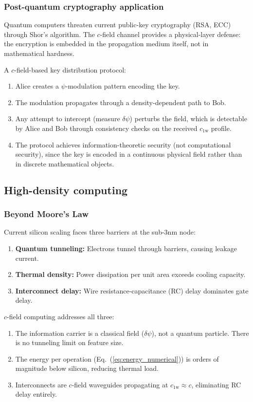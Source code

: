 \documentclass[aps,prd,twocolumn,superscriptaddress,nofootinbib,floatfix]{revtex4-2}
\newcommand{\psifield}{\psi}
\newcommand{\cfield}{c_{\text{1w}}}
\newcommand{\cvac}{c}
\begin{document}
\subsubsection{Post-quantum cryptography application}

Quantum computers threaten current public-key cryptography
(RSA, ECC) through Shor's algorithm. The $c$-field channel
provides a physical-layer defense: the encryption is embedded
in the propagation medium itself, not in mathematical hardness.

A $c$-field-based key distribution protocol:
\begin{enumerate}
\item Alice creates a $\psifield$-modulation pattern encoding the
key.
\item The modulation propagates through a density-dependent path
to Bob.
\item Any attempt to intercept (measure $\delta\psifield$) perturbs
the field, which is detectable by Alice and Bob through consistency
checks on the received $\cfield$ profile.
\item The protocol achieves information-theoretic security
(not computational security), since the key is encoded in a
continuous physical field rather than in discrete mathematical
objects.
\end{enumerate}

\subsection{High-density computing}

\subsubsection{Beyond Moore's Law}

Current silicon scaling faces three barriers at the sub-3nm node:
\begin{enumerate}
\item \textbf{Quantum tunneling:} Electrons tunnel through
barriers, causing leakage current.
\item \textbf{Thermal density:} Power dissipation per unit area
exceeds cooling capacity.
\item \textbf{Interconnect delay:} Wire resistance-capacitance
(RC) delay dominates gate delay.
\end{enumerate}

$c$-field computing addresses all three:
\begin{enumerate}
\item The information carrier is a classical field
($\delta\psifield$), not a quantum particle. There is no tunneling
limit on feature size.
\item The energy per operation (Eq.~(\ref{eq:energy_numerical}))
is orders of magnitude below silicon, reducing thermal load.
\item Interconnects are $c$-field waveguides propagating at
$\cfield \approx \cvac$, eliminating RC delay entirely.
\end{enumerate}
\end{document}
